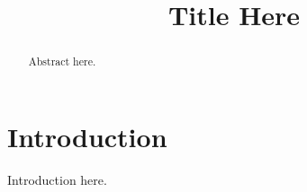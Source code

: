 \documentclass[conference]{IEEEtran}
\newcommand{\papertitle}{Title Here}
\begin{document}

\title{\papertitle}
\author{
\and
{}
}



\maketitle

\begin{abstract}
Abstract here.
\end{abstract}

\IEEEpeerreviewmaketitle

\section{Introduction}

Introduction here. \cite{example}

\end{document}
